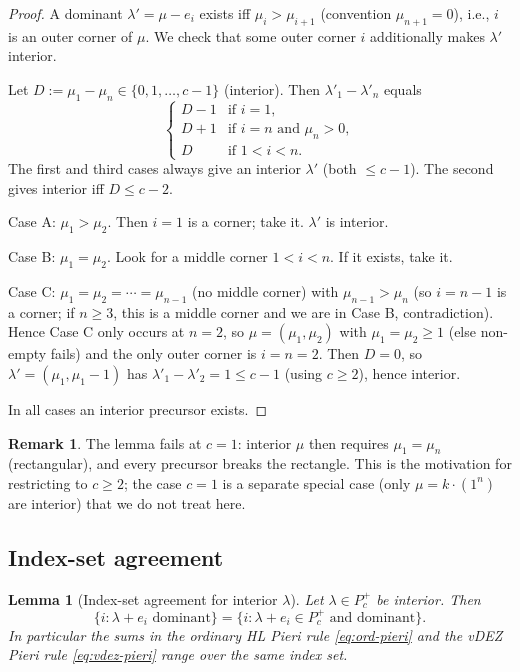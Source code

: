 \documentclass[11pt]{article}
\newtheorem{lemma}[theorem]{Lemma}
\theoremstyle{definition}
\newtheorem{remark}[theorem]{Remark}
\newcommand{\Pcp}{P_c^+}
\begin{document}
\begin{proof}
A dominant $\lambda' = \mu - e_i$ exists iff $\mu_i > \mu_{i+1}$
(convention $\mu_{n+1} = 0$), i.e., $i$ is an outer corner of $\mu$.
We check that some outer corner $i$ additionally makes $\lambda'$ interior.

Let $D := \mu_1 - \mu_n \in \{0, 1, \ldots, c-1\}$ (interior). Then
$\lambda'_1 - \lambda'_n$ equals
\[
\begin{cases}
D - 1 & \text{if } i = 1, \\
D + 1 & \text{if } i = n\text{ and }\mu_n > 0, \\
D & \text{if } 1 < i < n.
\end{cases}
\]
The first and third cases always give an interior $\lambda'$ (both $\le c-1$).
The second gives interior iff $D \le c-2$.

Case A: $\mu_1 > \mu_2$. Then $i = 1$ is a corner; take it. $\lambda'$ is interior.

Case B: $\mu_1 = \mu_2$. Look for a middle corner $1 < i < n$. If it exists, take it.

Case C: $\mu_1 = \mu_2 = \cdots = \mu_{n-1}$ (no middle corner) with $\mu_{n-1} > \mu_n$
(so $i = n-1$ is a corner; if $n \ge 3$, this is a middle corner and we are
in Case B, contradiction). Hence Case C only occurs at $n = 2$, so
$\mu = (\mu_1, \mu_2)$ with $\mu_1 = \mu_2 \ge 1$ (else non-empty fails)
and the only outer corner is $i = n = 2$. Then $D = 0$, so
$\lambda' = (\mu_1, \mu_1 - 1)$ has $\lambda'_1 - \lambda'_2 = 1 \le c - 1$
(using $c \ge 2$), hence interior.

In all cases an interior precursor exists.
\end{proof}

\begin{remark}
The lemma fails at $c = 1$: interior $\mu$ then requires $\mu_1 = \mu_n$
(rectangular), and every precursor breaks the rectangle. This is the
motivation for restricting to $c \ge 2$; the case $c=1$ is a separate
special case (only $\mu = k \cdot(1^n)$ are interior) that we do not treat
here.
\end{remark}

\subsection{Index-set agreement}

\begin{lemma}[Index-set agreement for interior $\lambda$]
\label{lem:index-agree}
Let $\lambda \in \Pcp$ be interior. Then
\[
\{i : \lambda + e_i\text{ dominant}\}
= \{i : \lambda + e_i \in \Pcp \text{ and dominant}\}.
\]
In particular the sums in the ordinary HL Pieri rule \eqref{eq:ord-pieri}
and the vDEZ Pieri rule \eqref{eq:vdez-pieri} range over the same index set.
\end{lemma}
\end{document}
